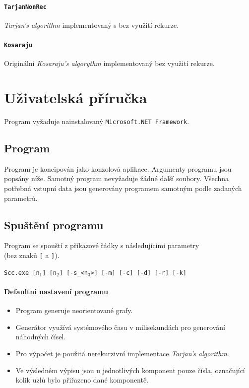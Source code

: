 \documentclass[12pt]{article}
\begin{document}
\paragraph{\texttt{TarjanNonRec}}
\textit{Tarjan's algorithm} implementovaný s bez využití rekurze.

\paragraph{\texttt{Kosaraju}}
Originální \textit{Kosaraju's algorythm} implementovaný bez využití rekurze.

\section{Uživatelská příručka}
Program vyžaduje nainstalovaný \texttt{Microsoft.NET Framework}.

\subsection{Program}
Program je koncipován jako konzolová aplikace. Argumenty programu jsou popsány níže. Samotný program nevyžaduje žádné další soubory. Všechna potřebná vstupní data jsou generovány programem samotným podle zadaných parametrů.

\subsection{Spuštění programu}
Program se spouští z příkazové řádky s následujícími parametry \\(bez znaků \texttt{[} a \texttt{]}).

\texttt{Scc.exe [n$_1$] [n$_2$] [-s\_<n$_3$>] [-m] [-c] [-d] [-r] [-k]}

\paragraph{Defaultní nastavení programu}
\begin{itemize}
\setlength\itemsep{1px}
\renewcommand\labelitemi{--}
\item Program generuje neorientované grafy.
\item Generátor využívá systémového času v milisekundách pro generování náhodných čísel.
\item Pro výpočet je použitá nerekurzivní implementace \textit{Tarjan's algorithm}.
\item Ve výsledném výpisu jsou u jednotlivých komponent pouze čísla, označující kolik uzlů bylo přiřazeno dané komponentě.
\end{itemize}
\end{document}

